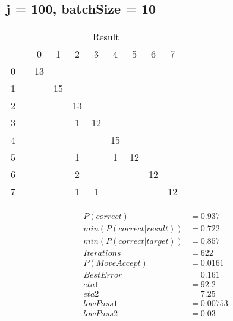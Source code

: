 \documentclass[10pt, conference, compsocconf]{IEEEtran}
\begin{document}
\subsection{j = 100, batchSize = 10}
\begin{center}
\begin{tabular}{l*{10}{c}r}
& & & & & \multicolumn{2}{c}{Result}  & & \\
 &\vline& 0 & 1 & 2 & 3 & 4 & 5 & 6 & 7 \\
\hline
0 &\vline&   13&    &    &    &    &    &    &   \\
 1 &\vline&     &  15&    &    &    &    &    &   \\
 2 &\vline&     &    &  13&    &    &    &    &   \\
 3 &\vline&     &    &   1&  12&    &    &    &   \\
 4 &\vline&     &    &    &    &  15&    &    &   \\
 5 &\vline&     &    &   1&    &   1&  12&    &   \\
 6 &\vline&     &    &   2&    &    &    &  12&   \\
 7 &\vline&     &    &   1&   1&    &    &    &  12\\
\end{tabular}
\begin{align}
P( correct )  &=  0.937\\
min( P( correct |  result  ) )  &=   0.722\\
min( P( correct | target ) )  &=   0.857\\
Iterations &=   622\\
P(Move Accept) &=   0.0161\\
Best Error &=   0.161\\
eta1   &=     92.2\\
eta2    &=    7.25\\
lowPass1  &=  0.00753\\
lowPass2  &=  0.03
\end{align}
\end{center}
\end{document}

